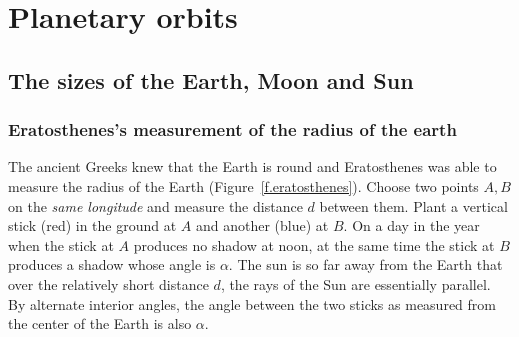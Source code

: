 

\part{Planetary orbits}


\chapter{The sizes of the Earth, Moon and Sun}\label{s.aristarchus}


\section{Eratosthenes's measurement of the radius of the earth}\label{s.eratosthenes}

The ancient Greeks knew that the Earth is round and Eratosthenes was able to measure the radius of the Earth (Figure~\ref{f.eratosthenes}). Choose two points $A,B$ on the \emph{same longitude} and measure the distance $d$ between them. Plant a vertical stick (red) in the ground at $A$ and another (blue) at $B$. On a day in the year when the stick at $A$ produces no shadow at noon, at the same time the stick at $B$ produces a shadow whose angle is $\alpha$. The sun is so far away from the Earth that over the relatively short distance $d$, the rays of the Sun are essentially parallel. By alternate interior angles, the angle between the two sticks as measured from the center of the Earth is also $\alpha$.

